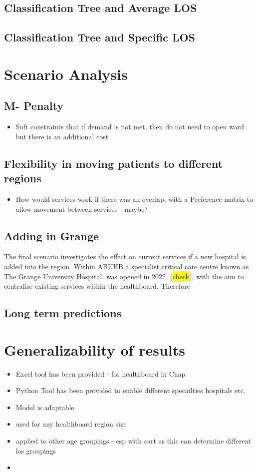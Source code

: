 \documentclass[../thesis.tex]{subfiles}
\begin{document}
\newpage


\subsection{Classification Tree and Average LOS}
\subsection{Classification Tree and Specific LOS}
\section{Scenario Analysis}

\subsection{M- Penalty}
\begin{itemize}
    \item Soft constraints that if demand is not met, then do not need to open ward but there is an additional cost
\end{itemize}
\subsection{Flexibility in moving patients to different regions}
\begin{itemize}
    \item How would services work if there was an overlap, with a Preference matrix to allow movement between services - maybe? 
\end{itemize}

\subsection{Adding in Grange}
The final scenario investigates the effect on current services if a new hospital is added into the region. Within ABUHB a specialist critical care centre known as The Grange University Hospital, was opened in 2022, (\hl{check}), with the aim to centralise existing services within the healthboard. Therefore 
\subsection{Long term predictions}


\section{Generalizability of results}
\begin{itemize}
\item Excel tool has been provided - for healthboard in Chap
\item Python Tool has been provided to enable different specailties  hospitals etc.
    \item Model is adaptable
    \item used for any healthboard region size
    \item applied to other age groupings - esp with cart as this can determine different los groupings
    \item 
\end{itemize}
\end{document}

